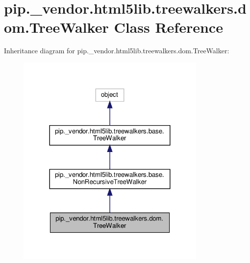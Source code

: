 \hypertarget{classpip_1_1__vendor_1_1html5lib_1_1treewalkers_1_1dom_1_1TreeWalker}{}\section{pip.\+\_\+vendor.\+html5lib.\+treewalkers.\+dom.\+Tree\+Walker Class Reference}
\label{classpip_1_1__vendor_1_1html5lib_1_1treewalkers_1_1dom_1_1TreeWalker}


Inheritance diagram for pip.\+\_\+vendor.\+html5lib.\+treewalkers.\+dom.\+Tree\+Walker\+:
\nopagebreak
\begin{figure}[H]
\begin{center}
\leavevmode
\includegraphics[width=264pt]{classpip_1_1__vendor_1_1html5lib_1_1treewalkers_1_1dom_1_1TreeWalker__inherit__graph}
\end{center}
\end{figure}


